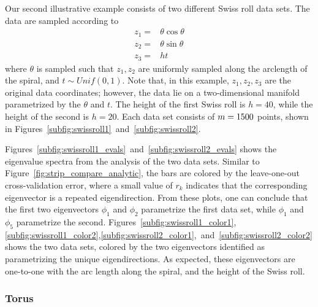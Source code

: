 Our second illustrative example consists of two different Swiss roll data sets.
%
The data are sampled according to
\begin{equation}
\begin{aligned}
z_1 =& \theta \cos \theta \\
z_2 =& \theta \sin \theta \\
z_3 =& h t
\end{aligned}
\end{equation}
%
where $\theta$ is sampled such that $z_1, z_2$ are uniformly sampled along the arclength of the spiral, and $t \sim Unif(0,1)$.
%
Note that, in this example, $z_1, z_2, z_3$ are the original data coordinates; however, the data lie on a two-dimensional manifold parametrized by the $\theta$ and $t$.
%
The height of the first Swiss roll is $h = 40$, while the height of the second is $h = 20$.
%
Each data set consists of $m=1500$ points, shown in Figures~\ref{subfig:swissroll1}~and~\ref{subfig:swissroll2}.
%

Figures~\ref{subfig:swissroll1_evals}~and~\ref{subfig:swissroll2_evals} shows the eigenvalue spectra from the analysis of the two data sets.
%
Similar to Figure~\ref{fig:strip_compare_analytic}, the bars are colored by the leave-one-out cross-validation error, where a small value of $r_k$ indicates that the corresponding eigenvector is a repeated eigendirection.
%
From these plots, one can conclude that the first two eigenvectors $\phi_1$ and $\phi_2$ parametrize the first data set, while $\phi_1$ and $\phi_5$ parametrize the second.
%
Figures~\ref{subfig:swissroll1_color1},\ref{subfig:swissroll1_color2},\ref{subfig:swissroll2_color1},~and~\ref{subfig:swissroll2_color2} shows the two data sets, colored by the two eigenvectors identified as parametrizing the unique eigendirections.
%
As expected, these eigenvectors are one-to-one with the arc length along the spiral, and the height of the Swiss roll.

\subsubsection{Torus}

